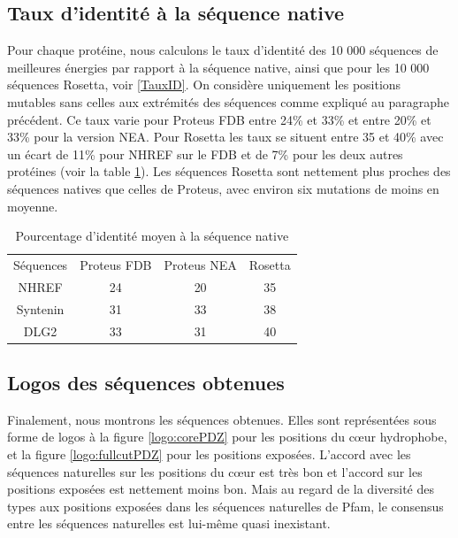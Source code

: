   
\subsection{Taux d'identité à la séquence native}  
  
Pour chaque protéine, nous calculons le taux d'identité des 10 000 séquences de meilleures énergies par rapport à la séquence native, ainsi que pour les 10 000 séquences Rosetta, voir \ref{TauxID}. On considère uniquement les positions mutables sans celles aux extrémités des séquences comme expliqué au paragraphe précédent. Ce taux varie pour Proteus FDB entre 24\% et 33\% et entre 20\% et 33\% pour la version NEA. Pour Rosetta les taux se situent entre 35 et 40\% avec un écart de 11\% pour NHREF sur le FDB et de 7\% pour les deux autres protéines (voir la table \ref{tab:IdentNEA}). Les séquences Rosetta sont nettement plus proches des séquences natives que celles de Proteus, avec environ six mutations de moins en moyenne.  

\begin{table}[!htbp]
      \centering

      \begin{tabular}{cccc}

        \toprule
        Séquences & Proteus FDB & Proteus NEA & Rosetta \\
        \cmidrule{1-4}
        NHREF     & 24 & 20 & 35 \\
        Syntenin  & 31 & 33 & 38 \\
        DLG2      & 33 & 31 & 40 \\
        \bottomrule

      \end{tabular}      
      \caption{Pourcentage d'identité moyen à la séquence native}
\label{tab:IdentNEA}      
    \end{table}

\subsection{Logos des séquences obtenues}
Finalement, nous montrons les séquences obtenues. Elles sont représentées sous forme de logos à la figure \ref{logo:corePDZ} pour les positions du cœur hydrophobe, et la figure \ref{logo:fullcutPDZ} pour les positions exposées. L'accord avec les séquences naturelles sur les positions du cœur est très bon et l'accord sur les positions exposées est nettement moins bon. Mais au regard de la diversité des types aux positions exposées dans les séquences naturelles de Pfam, le consensus entre les séquences naturelles est lui-même quasi inexistant.

